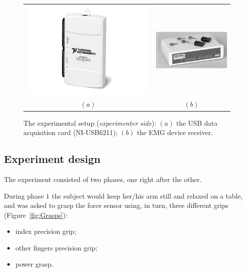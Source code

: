 \begin{figure}[!t] \centering
  \begin{tabular}{cc}
   \includegraphics[height=0.16\textheight]{figs/NI-6211} &
    \includegraphics[height=0.16\textheight]{figs/Zero_Base} \\
  $(a)$ & $(b)$\\
  \end{tabular}
  \caption{The experimental setup (\textit{experimenter side}): $(a)$
   the USB data acquisition card (NI-USB6211); $(b)$ the EMG device
   receiver.}
  \label{fig:ExpSetup}
\end{figure}

\subsection{Experiment design}

The experiment consisted of two phases, one right after the
other.

During phase $1$ the subject would keep her/his arm still and relaxed
on a table, and was asked to grasp the force sensor using, in turn,
three different grips (Figure~\ref{fig:Grasps}):

\begin{itemize}
  \item index precision grip;
  \item other fingers precision grip;
  \item power grasp.
\end{itemize}

